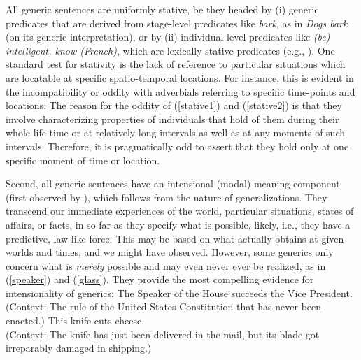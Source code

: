 \documentclass[output=paper,colorlinks,citecolor=brown]{langscibook}
\begin{document}
\noindent
All generic sentences are uniformly stative, 
be they headed by (i) generic predicates  that are derived from stage-level predicates like \textit{bark}, as in \textit{Dogs bark} (on its generic interpretation),
or by (ii) individual-level predicates like \textit{(be) intelligent, know (French)}, which are lexically stative predicates (e.g.,  \citealt{chierchia1995}). One standard test for stativity is the lack of reference to particular situations which are locatable 
at specific spatio-temporal locations. 
For instance, this is evident in the incompatibility or oddity with adverbials referring to specific time-points and locations:
\ea {} 
\z
\z
\noindent 
The reason for the oddity of (\ref{stative1}) 
and (\ref{stative2}) is that they involve characterizing properties of individuals that hold of them during their whole life-time or at relatively long intervals as well as at any moments of such intervals. Therefore, it is pragmatically odd to assert that they hold only at one specific moment of time or location.


Second, all generic sentences have an intensional (modal) meaning component
(first observed by \citealt{lawler1973,dahl1975}),
which follows from the nature of generalizations. 
They transcend our immediate experiences of 
the world, particular situations, 
states of affairs, or facts, in so far as 
they specify what is possible, likely, i.e., they have a predictive, law-like force. This may be based on what 
actually obtains at given worlds and times, and 
we might have observed. 
However, some generics only 
concern what is \textit{merely} 
possible and may even never ever be realized, as in 
(\ref{speaker}) and (\ref{glass}). They provide the most compelling evidence for intensionality of generics:
\ea
\ea \label{speaker} The Speaker of the House succeeds the Vice President.
(Context: The rule of the United States Constitution that has never been enacted.)
\ex \label{glass} This knife cuts cheese.\\
(Context: The knife has just been delivered in the mail, but its blade got irreparably damaged in shipping.)
\z
\z
\end{document}
